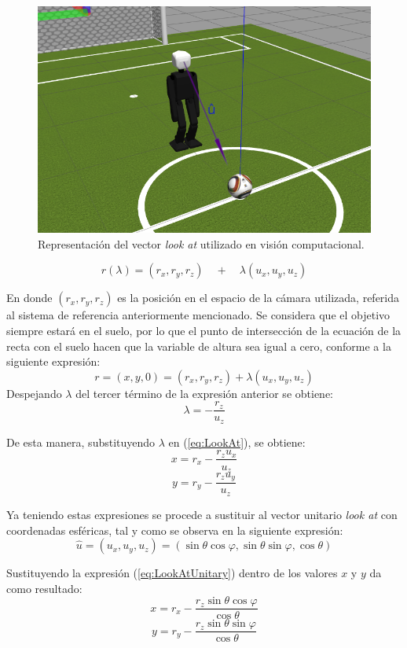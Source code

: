\begin{figure}
	\centering		
	\includegraphics[scale=2]{images/robot_lookat.png}
	\caption{Representación del vector \textit{look at} utilizado en visión computacional.}		
	\label{fig:LookAt}
\end{figure}

\begin{equation}
\label{eq:LookAt}
r(\lambda) = (r_x, r_y, r_z)\quad +\quad \lambda (u_x, u_y, u_z)
\end{equation}


En donde $(r_x, r_y, r_z)$ es la posición en el espacio de la cámara utilizada, referida al sistema de referencia anteriormente mencionado. Se considera que el objetivo siempre estará en el suelo, por lo que el punto de intersección de la ecuación de la recta con el suelo hacen que la variable de altura sea igual a cero, conforme a la siguiente expresión:
\[r = (x, y, 0) = (r_x, r_y, r_z) + \lambda (u_x, u_y, u_z)\]
Despejando $\lambda$ del tercer término de la expresión anterior se obtiene:
\[\lambda = -\frac{r_z}{u_z}\]

De esta manera, substituyendo $\lambda$ en (\ref{eq:LookAt}), se obtiene:
\[x = r_x-\frac{r_z u_x}{u_z}\]
\[y = r_y-\frac{r_z u_y}{u_z}\]

Ya teniendo estas expresiones se procede a sustituir al vector unitario \textit{look at} con coordenadas esféricas, tal y como se observa en la siguiente expresión:
\begin{equation}
\label{eq:LookAtUnitary}
\hat{u}=(u_x, u_y, u_z)=(\sin{ \theta}\cos{\varphi},\sin{\theta}\sin{ \varphi},\cos{\theta})
\end{equation}

Sustituyendo la expresión (\ref{eq:LookAtUnitary}) dentro de los valores $x$ y $y$ da como resultado:
\[x=r_x - \frac{r_z \sin{ \theta} \cos{\varphi}}{\cos{\theta}}\]
\[y=r_y - \frac{r_z \sin{\theta} \sin{ \varphi}}{\cos{\theta}}\]

